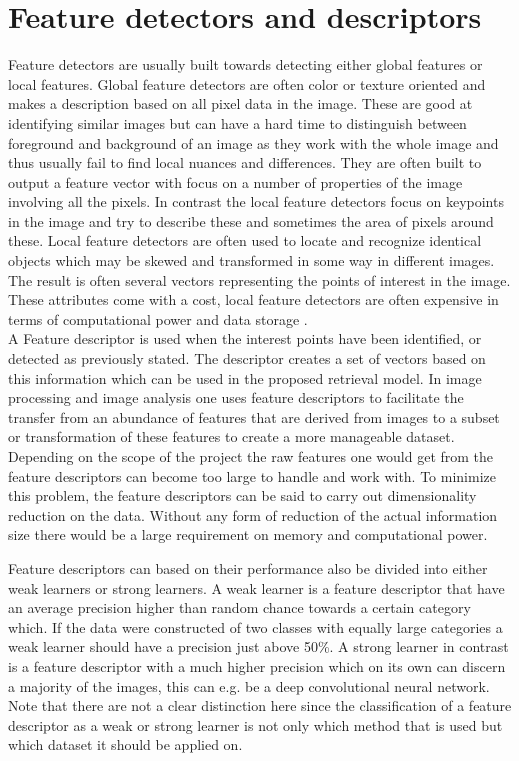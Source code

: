 \section{Feature detectors and descriptors}
\label{sec:feature_descriptors}
Feature detectors are usually built towards detecting either global features or local features. Global feature detectors are often color or texture oriented and makes a description based on all pixel data in the image. These are good at identifying similar images but can have a hard time to distinguish between foreground and background of an image as they work with the whole image and thus usually fail to find local nuances and differences. They are often built to output a feature vector with focus on a number of properties of the image involving all the pixels. In contrast the local feature detectors focus on keypoints in the image and try to describe these and sometimes the area of pixels around these. Local feature detectors are often used to locate and recognize identical objects which may be skewed and transformed in some way in different images. The result is often several vectors representing the points of interest in the image. These attributes come with a cost, local feature detectors are often expensive in terms of computational power and data storage \cite{hassaballah2016image}. \\

A Feature descriptor is used when the interest points have been identified, or detected as previously stated. The descriptor creates a set of vectors based on this information which can be used in the proposed retrieval model. In image processing and image analysis one uses feature descriptors to facilitate the transfer from an abundance of features that are derived from images to a subset or transformation of these features to create a more manageable dataset. Depending on the scope of the project the raw features one would get from the feature descriptors can become too large to handle and work with. To minimize this problem, the feature descriptors can be said to carry out dimensionality reduction on the data. Without any form of reduction of the actual information size there would be a large requirement on memory and computational power.

Feature descriptors can based on their performance also be divided into either weak learners or strong learners. A weak learner is a feature descriptor that have an average precision higher than random chance towards a certain category which. If the data were constructed of two classes with equally large categories a weak learner should have a precision just above 50\%. A strong learner in contrast is a feature descriptor with a much higher precision which on its own can discern a majority of the images, this can e.g. be a deep convolutional neural network. Note that there are not a clear distinction here since the classification of a feature descriptor as a weak or strong learner is not only which method that is used but which dataset it should be applied on. 


